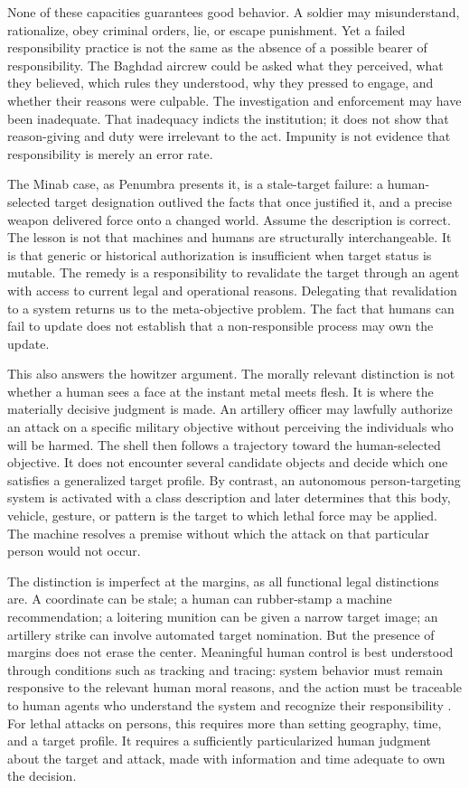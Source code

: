 \documentclass[11pt]{article}
\begin{document}
None of these capacities guarantees good behavior. A soldier may misunderstand, rationalize, obey criminal orders, lie, or escape punishment. Yet a failed responsibility practice is not the same as the absence of a possible bearer of responsibility. The Baghdad aircrew could be asked what they perceived, what they believed, which rules they understood, why they pressed to engage, and whether their reasons were culpable. The investigation and enforcement may have been inadequate. That inadequacy indicts the institution; it does not show that reason-giving and duty were irrelevant to the act. Impunity is not evidence that responsibility is merely an error rate.

The Minab case, as Penumbra presents it, is a stale-target failure: a human-selected target designation outlived the facts that once justified it, and a precise weapon delivered force onto a changed world. Assume the description is correct. The lesson is not that machines and humans are structurally interchangeable. It is that generic or historical authorization is insufficient when target status is mutable. The remedy is a responsibility to revalidate the target through an agent with access to current legal and operational reasons. Delegating that revalidation to a system returns us to the meta-objective problem. The fact that humans can fail to update does not establish that a non-responsible process may own the update.

This also answers the howitzer argument. The morally relevant distinction is not whether a human sees a face at the instant metal meets flesh. It is where the materially decisive judgment is made. An artillery officer may lawfully authorize an attack on a specific military objective without perceiving the individuals who will be harmed. The shell then follows a trajectory toward the human-selected objective. It does not encounter several candidate objects and decide which one satisfies a generalized target profile. By contrast, an autonomous person-targeting system is activated with a class description and later determines that this body, vehicle, gesture, or pattern is the target to which lethal force may be applied. The machine resolves a premise without which the attack on that particular person would not occur.

The distinction is imperfect at the margins, as all functional legal distinctions are. A coordinate can be stale; a human can rubber-stamp a machine recommendation; a loitering munition can be given a narrow target image; an artillery strike can involve automated target nomination. But the presence of margins does not erase the center. Meaningful human control is best understood through conditions such as tracking and tracing: system behavior must remain responsive to the relevant human moral reasons, and the action must be traceable to human agents who understand the system and recognize their responsibility \citep{santoni2018}. For lethal attacks on persons, this requires more than setting geography, time, and a target profile. It requires a sufficiently particularized human judgment about the target and attack, made with information and time adequate to own the decision.
\end{document}
